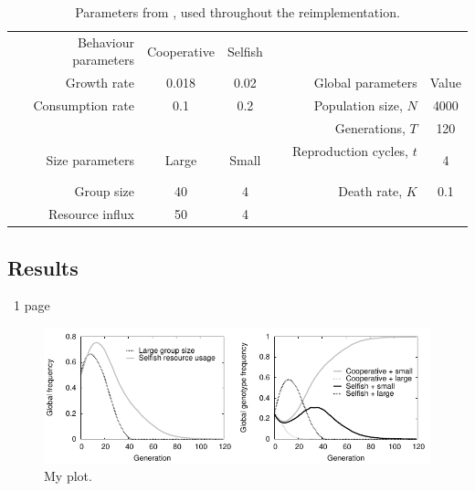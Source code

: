 \documentclass[11pt]{article}
\begin{document}
\begin{table}[!htb]
  \centering
  \begin{tabular}{r|c|ccr|c}
  Behaviour parameters	& Cooperative	& Selfish	&  & \multicolumn{1}{c}{} & \\ \cline{1-3}
  Growth rate 			& 0.018			& 0.02		&  & Global parameters	& Value\\ \cline{5-6}
  Consumption rate 		& 0.1			& 0.2		&  & Population size, $N$	& 4000\\
  \multicolumn{1}{r}{} & \multicolumn{1}{c}{} & \multicolumn{1}{c}{} &  & Generations, $T$ & 120 \\
  Size parameters		& Large			& Small		&  & Reproduction cycles, $t$~ 		& 4\\ \cline{1-3}
  Group size			& 40			& 4			&  & Death rate, $K$ & 0.1\\
  Resource influx		& 50			& 4			&  & \multicolumn{1}{c}{} & \\
  \end{tabular}
  \caption{Parameters from \cite{orig}, used throughout the reimplementation.}
  \label{Table:table1}
\end{table}

\subsection{Results}
~1 page
\begin{figure}[!ht]
  \centering
  \includegraphics{plot.pdf}
  \caption{My plot.}
  \label{Figure:plot}
\end{figure}
\end{document}
